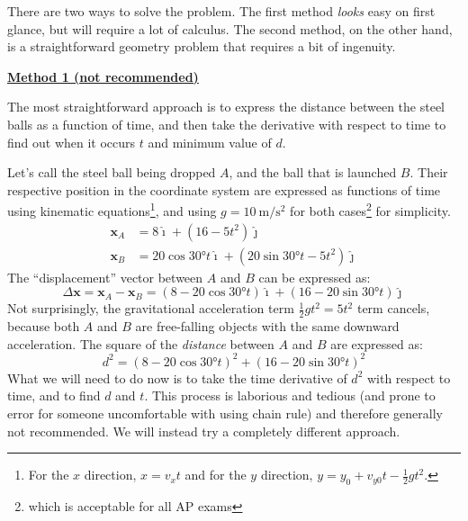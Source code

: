 \documentclass[11pt]{article}
\newcommand{\mb}[1]{\mathbf{#1}}
\newcommand{\iii}{\bm{\hat{\imath}}}
\newcommand{\jjj}{\bm{\hat{\jmath}}}
\begin{document}

There are two ways to solve the problem. The first method \emph{looks} easy on
first glance, but will require a lot of calculus. The second method, on the
other hand, is a straightforward geometry problem that requires a bit of
ingenuity.

\textbf{\underline{Method 1 (not recommended)}}

The most straightforward approach is to express the distance between the steel
balls as a function of time, and then take the derivative with respect to time
to find out when it occurs $t$ and minimum value of $d$.

Let's call the steel ball being dropped $A$, and the ball that is launched
$B$. Their respective position in the coordinate system are expressed as
functions of time using kinematic equations\footnote{For the $x$ direction,
  $x=v_xt$ and for the $y$ direction, $y=y_0+v_{y0}t-\frac12gt^2$.}, and using
$g=\SI{10}{\metre\per\second^2}$ for both cases\footnote{which is acceptable
  for all AP exams} for simplicity.
\begin{align}
  \mb{x}_A &= 8\iii + (16-5t^2)\jjj \\
  \mb{x}_B &=20\cos\ang{30}t\iii+(20\sin\ang{30}t-5t^2)\jjj
\end{align}
The ``displacement'' vector between $A$ and $B$ can be expressed as:
\begin{equation}
  \Delta\mb{x}
  =\mb{x}_A-\mb{x}_B
  =(8-20\cos\ang{30}t)\iii + (16-20\sin\ang{30}t)\jjj
  \label{no-g}
\end{equation}
Not surprisingly, the gravitational acceleration term $\frac12gt^2=5t^2$ term
cancels, because both $A$ and $B$ are free-falling objects with the same
downward acceleration. The square of the \emph{distance} between $A$ and $B$ are
expressed as:
\begin{equation}
  d^2 =(8-20\cos\ang{30}t)^2 + (16-20\sin\ang{30}t)^2
\end{equation}
What we will need to do now is to take the time derivative of $d^2$ with
respect to time, and to find $d$ and $t$. This process is laborious and
tedious (and prone to error for someone uncomfortable with using chain rule)
and therefore generally not recommended. We will instead try a completely
different approach.
\end{document}
